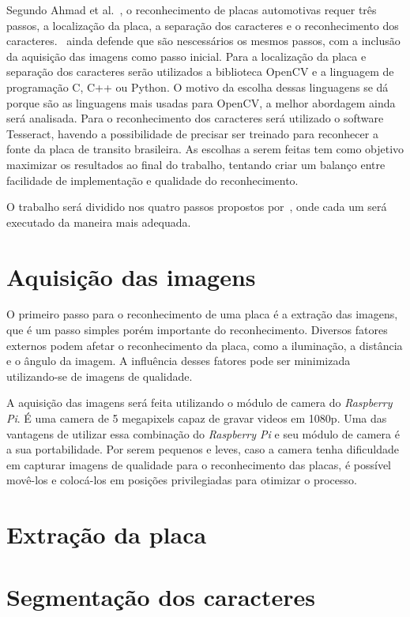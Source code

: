 Segundo Ahmad et al.~\cite{ahmad2015automatic}, o reconhecimento de placas
automotivas requer três passos, a localização da placa, a separação dos
caracteres e o reconhecimento dos caracteres.~\cite{s2013automatic} ainda defende que são nescessários 
os mesmos passos, com a inclusão da aquisição das imagens como passo inicial. Para a localização da placa e
separação dos caracteres serão utilizados a biblioteca OpenCV e a linguagem de
programação C, C++ ou Python. O motivo da escolha dessas linguagens se dá porque
são as linguagens mais usadas para OpenCV, a melhor abordagem ainda será
analisada. Para o reconhecimento dos caracteres será utilizado o software Tesseract, havendo a possibilidade 
de precisar ser treinado para reconhecer a fonte da placa de transito brasileira. As escolhas a serem
feitas tem como objetivo maximizar os resultados ao final do trabalho, tentando
criar um balanço entre facilidade de implementação e qualidade do
reconhecimento.

O trabalho será dividido nos quatro passos propostos por~\cite{s2013automatic}, onde cada um será 
executado da maneira mais adequada.

\section{Aquisição das imagens}
\label{sec:aquisicao}

O primeiro passo para o reconhecimento de uma placa é a extração das imagens, que é um passo simples 
porém importante do reconhecimento. Diversos fatores externos podem afetar o reconhecimento da placa, 
como a iluminação, a distância e o ângulo da imagem. A influência desses fatores pode ser minimizada 
utilizando-se de imagens de qualidade.

A aquisição das imagens será feita utilizando o módulo de camera do \emph{Raspberry Pi}. É uma camera de 
5 megapixels capaz de gravar videos em 1080p. Uma das vantagens de utilizar essa combinação do \emph{Raspberry Pi} 
e seu módulo de camera é a sua portabilidade. Por serem pequenos e leves, caso a camera tenha dificuldade em 
capturar imagens de qualidade para o reconhecimento das placas, é possível movê-los e colocá-los em posições 
privilegiadas para otimizar o processo.

\section{Extração da placa}
\label{sec:extracao}

\section{Segmentação dos caracteres}
\label{sec:segmentacao}

